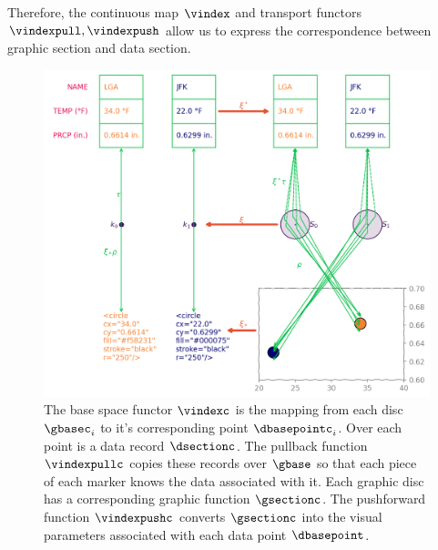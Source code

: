 \documentclass[10pt,journal,compsoc]{IEEEtran}
\theoremstyle{definition}
\theoremstyle{remark}
\begin{document}
Therefore, the continuous map $\vindex$ and transport functors $\vindexpull, \vindexpush$ allow us to express the correspondence between graphic section and data section. 

\begin{figure}[h!]
  \label{fig:atct:morphisms:sheaf}
  \includegraphics*[width=1\columnwidth]{xi_scatter.png}
  \caption{The base space functor $\vindexc$ is the mapping from each disc $\gbasec_i$ to it's corresponding point $\dbasepointc_i$. Over each point is a data record $\dsectionc$. The pullback function $\vindexpullc$ copies these records over $\gbase$ so that each piece of each marker knows the data associated with it. Each graphic disc has a corresponding graphic function $\gsectionc$. The pushforward function $\vindexpushc$ converts $\gsectionc$ into the visual parameters associated with each data point $\dbasepoint$.}
\end{figure}
\end{document}
